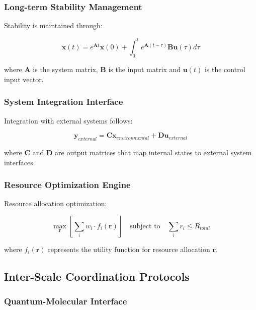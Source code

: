 \documentclass[12pt,a4paper]{article}
\begin{document}
\subsubsection{Long-term Stability Management}

Stability is maintained through:

\begin{equation}
\mathbf{x}(t) = e^{\mathbf{A}t} \mathbf{x}(0) + \int_0^t e^{\mathbf{A}(t-\tau)} \mathbf{B} \mathbf{u}(\tau) d\tau
\end{equation}

where $\mathbf{A}$ is the system matrix, $\mathbf{B}$ is the input matrix and $\mathbf{u}(t)$ is the control input vector.

\subsubsection{System Integration Interface}

Integration with external systems follows:

\begin{equation}
\mathbf{y}_{external} = \mathbf{C} \mathbf{x}_{environmental} + \mathbf{D} \mathbf{u}_{external}
\end{equation}

where $\mathbf{C}$ and $\mathbf{D}$ are output matrices that map internal states to external system interfaces.

\subsubsection{Resource Optimization Engine}

Resource allocation optimization:

\begin{equation}
\max_{\mathbf{r}} \left[ \sum_i w_i \cdot f_i(\mathbf{r}) \right] \quad \text{subject to} \quad \sum_i r_i \leq R_{total}
\end{equation}

where $f_i(\mathbf{r})$ represents the utility function for resource allocation $\mathbf{r}$.

\subsection{Inter-Scale Coordination Protocols}

\subsubsection{Quantum-Molecular Interface}
\end{document}
